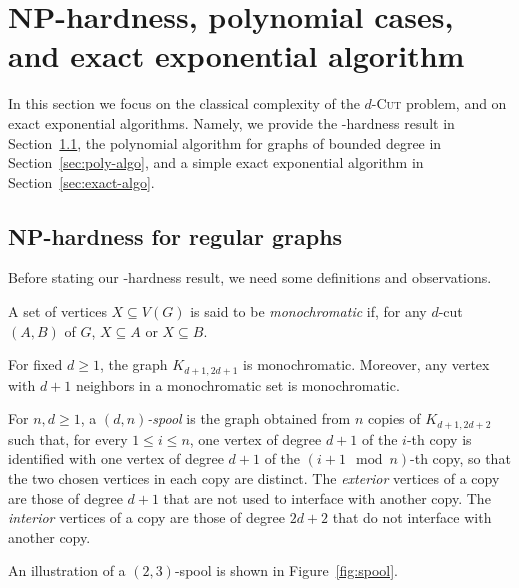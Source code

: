 \section{NP-hardness, polynomial cases, and exact exponential algorithm}
\label{sec:np}

In this section we focus on the classical complexity of the \textsc{$d$-Cut} problem, and on exact exponential algorithms. Namely, we provide the \NP-hardness result in Section~\ref{sec:NP-hard}, the polynomial algorithm for graphs of bounded degree in Section~\ref{sec:poly-algo}, and 
a simple exact exponential algorithm in Section~\ref{sec:exact-algo}.

\subsection{NP-hardness for regular graphs}
\label{sec:NP-hard}

Before stating our \NP-hardness result, we need some definitions and observations.

\begin{definition}
    A set of vertices $X \subseteq V(G)$ is said to be \emph{monochromatic} if, for any $d$-cut $(A, B)$ of $G$, $X \subseteq A$ or $X \subseteq B$.
\end{definition}

\begin{observation}
    \label{obs:mono_bipartite}
    For fixed $d \geq 1$, the graph $K_{d+1, 2d+1}$ is monochromatic.
    Moreover, any vertex with $d+1$ neighbors in a monochromatic set is monochromatic.
\end{observation}

\begin{definition}[Spool]
    For $n,d \geq 1$, a \emph{$(d, n)$-spool}  is the graph obtained from $n$  copies of $K_{d+1, 2d+2}$ such that, for every $1 \leq i \leq n$, one vertex of degree $d+1$ of the $i$-th copy is identified with one vertex of degree $d+1$ of the $(i+1 \mod n)$-th copy, so that the two chosen vertices in each copy are distinct. %
    The \emph{exterior} vertices of a copy are those of degree $d+1$ that are not used to interface with another copy.
    The \emph{interior} vertices of a copy are those of degree $2d+2$ that do not interface with another copy.
\end{definition}

An illustration of a $(2,3)$-spool is shown in Figure~\ref{fig:spool}.

